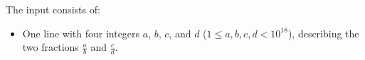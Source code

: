 
The input consists of:
\begin{itemize}
\item One line with four integers $a$, $b$, $c$, and $d$ ($1\leq a,b,c,d<10^{18}$), describing the two fractions $\frac{a}{b}$ and $\frac{c}{d}$.
\end{itemize}
